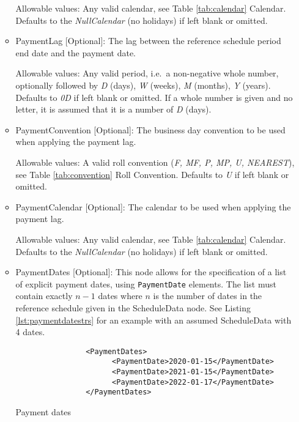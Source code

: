 \begin{itemize}
\begin{itemize}
      Allowable values: Any valid calendar, see Table \ref{tab:calendar} Calendar. Defaults to the \emph{NullCalendar} (no holidays) if left blank or omitted.
      
  \item PaymentLag [Optional]: The lag between the reference schedule period end date and the payment date.
  
    Allowable values: Any valid period, i.e.\ a non-negative whole number, optionally followed by \emph{D} (days), \emph{W} (weeks), \emph{M} (months),
  \emph{Y} (years). Defaults to \emph{0D} if left blank or omitted. If a whole number is given and no letter, it is assumed that it is a number of  \emph{D} (days).
    
  \item PaymentConvention [Optional]: The business day convention to be used when applying the payment lag.
  
    Allowable values: A valid roll convention (\emph{F, MF, P, MP, U, NEAREST}), see Table \ref{tab:convention} Roll Convention. Defaults to \emph{U} if left blank or omitted.
    
  \item PaymentCalendar [Optional]: The calendar to be used when applying the payment lag.
  
    Allowable values: Any valid calendar, see Table \ref{tab:calendar} Calendar. Defaults to the \emph{NullCalendar} (no holidays) if left blank or omitted.
    
  \item PaymentDates [Optional]: This node allows for the specification of a list of explicit payment dates, using
    \lstinline!PaymentDate! elements. The list must contain exactly $n-1$ dates where $n$ is the number of dates in the
    reference schedule given in the ScheduleData node. See Listing \ref{lst:paymentdatestrs} for an example with an
    assumed ScheduleData with 4 dates.
    
    \begin{listing}[H]
\begin{verbatim}
                <PaymentDates>
                      <PaymentDate>2020-01-15</PaymentDate>
                      <PaymentDate>2021-01-15</PaymentDate>
                      <PaymentDate>2022-01-17</PaymentDate>
                </PaymentDates>
\end{verbatim}
\caption{Payment dates}
\label{lst:paymentdatestrs}
\end{listing}
    

\end{itemize}
\end{itemize}

